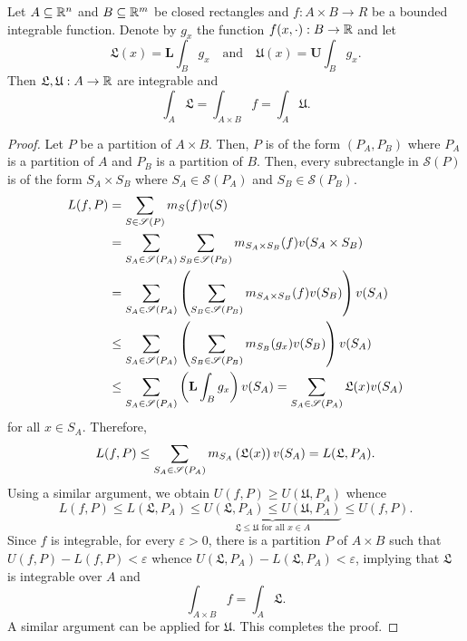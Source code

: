 \begin{theorem}[Fubini]
    Let $A\subseteq\mathbb{R}^n$ and $B\subseteq\mathbb{R}^m$ be closed rectangles and $f: A\times B\to R$ be a bounded integrable function. Denote by $g_x$ the function $f(x,\cdot): B\to\mathbb{R}$ and let 
    \begin{equation*}
        \mathfrak L(x) = \mathbf L\int_B g_x\quad\text{and}\quad\mathfrak U(x) = \mathbf U\int_B g_x.
    \end{equation*}
    Then $\mathfrak L, \mathfrak U: A\to\mathbb{R}$ are integrable and 
    \begin{equation*}
        \int_A \mathfrak L = \int_{A\times B} f = \int_A \mathfrak U.
    \end{equation*}
\end{theorem}
\begin{proof}
    Let $P$ be a partition of $A\times B$. Then, $P$ is of the form $(P_A, P_B)$ where $P_A$ is a partition of $A$ and $P_B$ is a partition of $B$. Then, every subrectangle in $\mathscr S(P)$ is of the form $S_A\times S_B$ where $S_A\in\mathscr S(P_A)$ and $S_B\in\mathscr S(P_B)$.
    \begin{align*}
        L(f, P) &= \sum_{S\in\mathscr S(P)} m_S(f)v(S)\\
        &= \sum_{S_A\in\mathscr S(P_A)}\sum_{S_B\in\mathscr S(P_B)} m_{S_A\times S_B}(f)v(S_A\times S_B)\\
        &= \sum_{S_A\in\mathscr S(P_A)}\left(\sum_{S_B\in\mathscr S(P_B)} m_{S_A\times S_B}(f)v(S_B)\right)v(S_A)\\
        &\le \sum_{S_A\in\mathscr S(P_A)}\left(\sum_{S_B\in\mathscr S(P_B)}m_{S_B}(g_x)v(S_B)\right)v(S_A)\\
        &\le\sum_{S_A\in\mathscr S(P_A)}\left(\mathbf L\int_B g_x\right) v(S_A) = \sum_{S_A\in\mathscr S(P_A)}\mathfrak L(x)v(S_A)
    \end{align*}
    for all $x\in S_A$. Therefore, 
    \begin{equation*}
        L(f,P)\le\sum_{S_A\in\mathscr S(P_A)}m_{S_A}\left(\mathfrak L(x)\right)v(S_A) = L(\mathfrak L, P_A).
    \end{equation*}
    Using a similar argument, we obtain $U(f,P)\ge U(\mathfrak U, P_A)$ whence 
    \begin{equation*}
        L(f,P)\le L(\mathfrak L, P_A)\le \underbrace{U(\mathfrak L, P_A)\le U(\mathfrak U, P_A)}_{\mathfrak L\le\mathfrak U\text{ for all } x\in A}\le U(f, P).
    \end{equation*}
    Since $f$ is integrable, for every $\varepsilon > 0$, there is a partition $P$ of $A\times B$ such that $U(f,P) - L(f,P) < \varepsilon$ whence $U(\mathfrak L, P_A) - L(\mathfrak L, P_A) < \varepsilon$, implying that $\mathfrak L$ is integrable over $A$ and 
    \begin{equation*}
        \int_{A\times B} f = \int_A\mathfrak L.
    \end{equation*}
    A similar argument can be applied for $\mathfrak U$. This completes the proof.
\end{proof}

